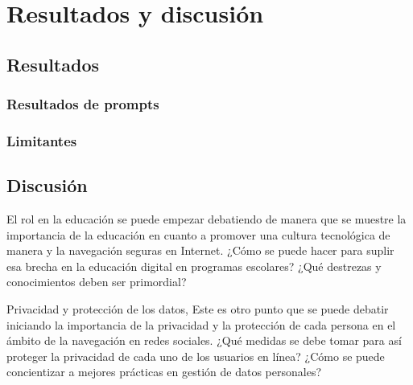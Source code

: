 \chapter{Resultados	y discusión}\label{cap:capitulo5}
\section{Resultados}\label{section:Resultados cap5}


\subsection{Resultados de prompts}\label{section:Análisis de resultados de entrenamiento y resspuestas de clasificación.}

\subsection{Limitantes}\label{section:Limitantes}
\section{Discusión }\label{section:Discusión}
El rol en la educación se puede empezar debatiendo de manera que se muestre la importancia de la educación en cuanto a promover una cultura tecnológica de manera y la navegación seguras en Internet. ¿Cómo se puede hacer para suplir esa brecha en la educación digital en programas escolares? ¿Qué destrezas y conocimientos deben ser primordial?

Privacidad y protección de los datos, Este es otro punto que se puede debatir iniciando la importancia de la privacidad y la protección de cada persona en el ámbito de la navegación en redes sociales. ¿Qué medidas se debe tomar para así proteger la privacidad de cada uno de los usuarios en línea? ¿Cómo se puede concientizar a mejores prácticas en gestión de datos personales?